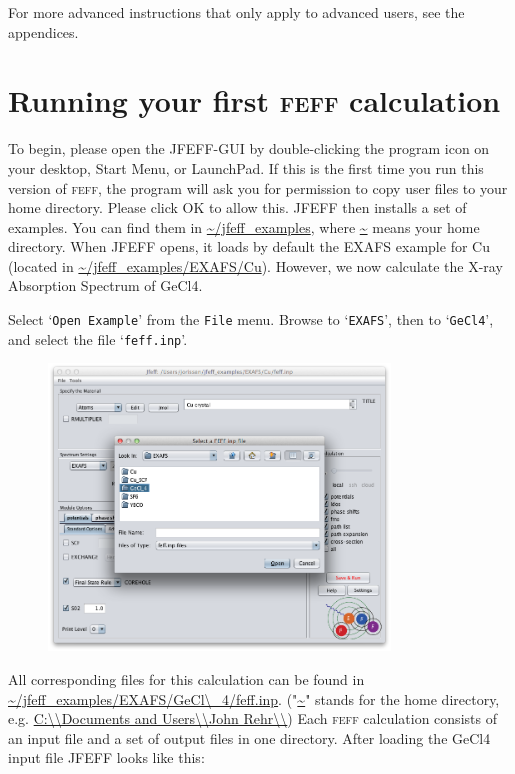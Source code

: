 \documentclass[11pt,oneside]{report} %
\renewcommand{\htmlref}[2]{\hyperlink{#2}{#1}}
\newcommand{\program}[1]{\textsc{#1}}
\newcommand{\feff}{\program{feff}}
\newcommand{\file}[1]{`\texttt{#1}'}
\renewcommand{\htmlref}[2]{{#1}} %
\begin{document}
For more advanced instructions that only apply to advanced users, see \htmlref{the appendices}{sec:Append-B-Inst}.

\section{Running your first {\feff} calculation}

To begin, please open the JFEFF-GUI by double-clicking the program icon on your desktop, Start Menu, or LaunchPad.  If this is the first time you run this version of {\feff}, the program will ask you for permission to copy user files to your home directory.  Please click OK to allow this.  JFEFF then installs a set of examples.  You can find them in \url{~/jfeff_examples}, where \url{~} means your home directory.  When JFEFF opens, it loads by default the EXAFS example for Cu (located in \url{~/jfeff_examples/EXAFS/Cu}).  However, we now calculate the X-ray Absorption Spectrum of GeCl4.


Select \file{Open Example} from the \texttt{File} menu.  Browse to \file{EXAFS}, then to \file{GeCl4}, and select the file \file{feff.inp}.

\begin{figure}[H]
	\centering
		\includegraphics[height=3.0in]{open1.png}
	\label{fig:open1}
\end{figure}

All corresponding files for this calculation can be found in  \url{~/jfeff_examples/EXAFS/GeCl\\_4/feff.inp}.  ("\url{~}" stands for the home directory, e.g. \url{C:\\Documents and Users\\John Rehr\\})  Each {\feff} calculation consists of an input file and a set of output files in one directory.  After loading the GeCl4 input file JFEFF looks like this:
\end{document}
